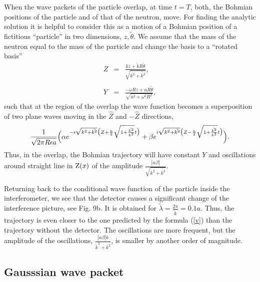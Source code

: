 \documentclass[12pt,preprint,tightenlines]{elsarticle}
\begin{document}
When the wave packets of the particle overlap, at time $t=T$, both,
the Bohmian positions of the particle and of that of the neutron, move. For
finding the analytic solution it is helpful to consider this as a
motion of a Bohmian position of a fictitious ``particle'' in two dimensions, $z,\tilde{\theta}$.
We assume that the mass of the neutron equal to the mass of the particle and change the basis to a ``rotated basis''
 \begin{eqnarray}
Z & = & \frac{kz+\tilde{k}R\tilde{\theta}}{\sqrt{k^{2}+\tilde{k^{2}}}},\nonumber \\
 & ~\\
Y & = & \frac{-\omega Rz+uR\tilde{\theta}}{\sqrt{u^{2}+\omega^{2}R^{2}}},\nonumber
\end{eqnarray}
 such that at the region of the overlap the wave function becomes
a superposition of two plane waves moving in the $\hat{Z}$ and $-\hat{Z}$
directions,
\begin{equation}
\frac{1}{\sqrt{2\pi R\epsilon a}}\Bigl(\alpha e^{-i\sqrt{k^{2}+\tilde{k^{2}}}\bigl(Z+\frac{u}{2}\sqrt{1+\frac{\tilde{k^{2}}}{k^{2}}}t\bigr)}+
\beta e^{i\sqrt{k^{2}+\tilde{k^{2}}}\bigl(Z-\frac{u}{2}\sqrt{1+\frac{\tilde{k^{2}}}{k^{2}}}t\bigr)}\Bigr).\label{Zofx}\end{equation}
 Thus, in the overlap, the Bohmian trajectory will have constant $Y$
and oscillations around straight line in ${\rm Z}(x)$ of the amplitude
$\frac{|\alpha\beta|}{\sqrt{k^{2}+\tilde{k^{2}}}}$.

Returning back to the conditional wave function of the particle inside the interferometer, we see that the detector causes a significant change of the interference picture, see Fig. 9b. It is obtained for $\tilde{\lambda}=\frac{2\pi}{\tilde{k}}=0.1a$.  Thus, the trajectory is even
closer to the one predicted by the formula (\ref{v}) than the trajectory without the detector. The oscillations
are more frequent, but the amplitude of the oscillations, $\frac{|\alpha\beta|k}{ \tilde{k}^{2}+ k^{2}}$, is  smaller by another order of magnitude.


\subsection{ Gausssian wave packet}
\end{document}

